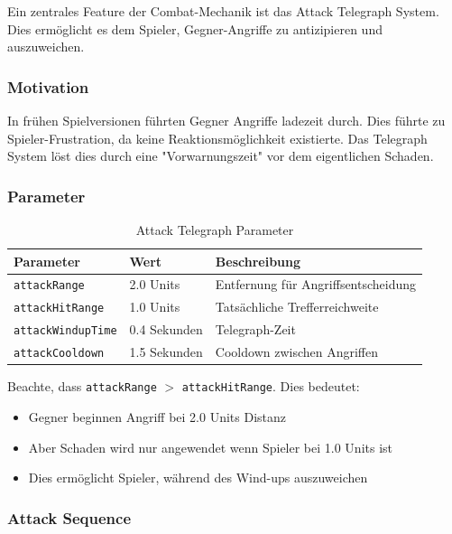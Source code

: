 \documentclass[
  a4paper,
  11pt,
  ngerman,
  parskip=half,
  bibliography=totoc,
  listof=totoc
]{scrreprt}
\begin{document}
Ein zentrales Feature der Combat-Mechanik ist das Attack Telegraph System. Dies ermöglicht es dem Spieler, Gegner-Angriffe zu antizipieren und auszuweichen.

\subsubsection{Motivation}

In frühen Spielversionen führten Gegner Angriffe ladezeit durch. Dies führte zu Spieler-Frustration, da keine Reaktionsmöglichkeit existierte. Das Telegraph System löst dies durch eine "Vorwarnungszeit" vor dem eigentlichen Schaden.

\subsubsection{Parameter}

\begin{table}[h]
\centering
\caption{Attack Telegraph Parameter}
\label{tab:attack_params}
\begin{tabular}{|l|l|l|}
\hline
\textbf{Parameter} & \textbf{Wert} & \textbf{Beschreibung} \\
\hline
\texttt{attackRange} & 2.0 Units & Entfernung für Angriffsentscheidung \\
\texttt{attackHitRange} & 1.0 Units & Tatsächliche Trefferreichweite \\
\texttt{attackWindupTime} & 0.4 Sekunden & Telegraph-Zeit \\
\texttt{attackCooldown} & 1.5 Sekunden & Cooldown zwischen Angriffen \\
\hline
\end{tabular}
\end{table}

Beachte, dass \texttt{attackRange} $>$ \texttt{attackHitRange}. Dies bedeutet:
\begin{itemize}
    \item Gegner beginnen Angriff bei 2.0 Units Distanz
    \item Aber Schaden wird nur angewendet wenn Spieler bei 1.0 Units ist
    \item Dies ermöglicht Spieler, während des Wind-ups auszuweichen
\end{itemize}

\subsubsection{Attack Sequence}
\end{document}
